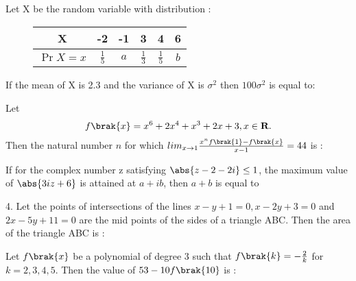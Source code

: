 \iffalse
    \title{2021}
    \author{EE24BTECH11001}
    \section{integer}
\fi
\item Let X be the random variable with distribution : 
        \begin{figure}
            \centering
            \begin{tabular}[12pt]{ |c| c| c | c | c| c|}
                \hline
                X & -2 & -1 & 3 & 4 & 6\\ 
                \hline
                $\Pr{X = x}$  & $\frac{1}{5}$ & $a$ & $\frac{1}{3}$ & $\frac{1}{5}$ & $b$ \\
                \hline 
            \end{tabular}
        \end{figure}
        If the mean of X is 2.3 and the variance of X is $\sigma ^ 2$ then $100\sigma ^ 2$ is equal to:
        \hfill{}\\

    \item Let 
        \begin{align}
            f\brak{x} = x^6 + 2x^4 + x^3 + 2x + 3, x \in \textbf{R}. 
        \end{align}
        Then the natural number $n$ for which $lim_{x \to 1} \frac{x^{n}f\brak{1} - f\brak{x}}{x - 1} = 44$ is :
        \hfill{}\\


    \item If for the complex number z satisfying $\abs{z - 2 -2i} \le 1$, the maximum value of $\abs{3iz + 6}$ is attained at $a + ib$, then $a + b$ is equal to
        \hfill{}\\


    \item[24.] 4. Let the points of intersections of the lines $x - y + 1 = 0, x -  2y + 3 = 0$ and $2x - 5y + 11 = 0$ are the mid points
        of the sides of a triangle ABC. Then the area of the triangle ABC is :
        \hfill{}\\


    \item Let $f\brak{x}$  be a polynomial of degree 3 such that $f\brak{k} = -\frac{2}{k}$ for $k = 2, 3, 4, 5$. Then the value of
        $53 - 10f\brak{10}$ is :
        \hfill{}\\


